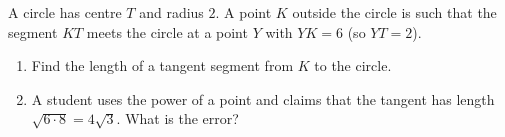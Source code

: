 A circle has centre $T$ and radius $2$. A point $K$ outside the circle is such that the segment $KT$ meets the circle at a point $Y$ with $YK=6$ (so $YT=2$).
\begin{enumerate}
\item[(a)] Find the length of a tangent segment from $K$ to the circle.
\item[(b)] A student uses the power of a point and claims that the tangent has length $\sqrt{6\cdot8}=4\sqrt3$. What is the error?
\end{enumerate}
